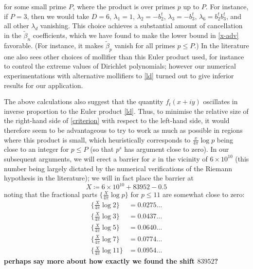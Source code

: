for some small prime $P$, where the product is over primes $p$ up to $P$.  For instance, if $P = 3$, then we would take $D=6$, $\lambda_1 = 1$, $\lambda_2 = - b_2^t$, $\lambda_3 = -b_3^t$, $\lambda_6 = b_2^t b_3^t$, and all other $\lambda_d$ vanishing.  This choice achieves a substantial amount of cancellation in the $\tilde \beta_n$ coefficients, which we have found to make the lower bound in \eqref{x-adv} favorable.  (For instance, it makes $\tilde \beta_p$ vanish for all primes $p \leq P$.)  In the literature one also sees other choices of mollifier than this Euler product used, for instance to control the extreme values of Dirichlet polynomials; however our numerical experimentations with alternative mollifiers to \eqref{ld} turned out to give inferior results for our application.

The above calculations also suggest that the quantity $f_t(x+iy)$ oscillates in inverse proportion to the Euler product \eqref{ld}.  Thus, to minimise the relative size of the right-hand side of \eqref{criterion} with respect to the left-hand side, it would therefore seem to be advantageous to try to work as much as possible in regions where this product is small, which heuristically corresponds to $\frac{x}{4\pi} \log p$ being close to an integer for $p \leq P$ (so that $p^s$ has argument close to zero).  In our subsequent arguments, we will erect a barrier for $x$ in the vicinity of $6 \times 10^{10}$ (this number being largely dictated by the numerical verifications of the Riemann hypothesis in the literature); we will in fact place the barrier at
$$ X \coloneqq 6 \times 10^{10} + 83952 - 0.5$$
noting that the fractional parts $\{ \frac{X}{4\pi} \log p\}$ for $p \leq 11$ are somewhat close to zero:
\begin{align*}
\{ \frac{X}{4\pi} \log 2 \} &= 0.0275\dots \\
\{ \frac{X}{4\pi} \log 3 \} &= 0.0437\dots \\
\{ \frac{X}{4\pi} \log 5 \} &= 0.0640\dots \\
\{ \frac{X}{4\pi} \log 7 \} &= 0.0774\dots\\
\{ \frac{X}{4\pi} \log 11 \} &= 0.0954\dots
\end{align*}
{\bf perhaps say more about how exactly we found the shift $83952$?}  
